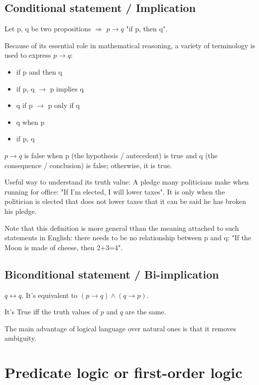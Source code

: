 \documentclass[12pt, a4paper]{book}
\begin{document}
\subsection*{Conditional statement / Implication}

Let p, q be two propositions $\Rightarrow$ $p \rightarrow q $ "if p, then q".

Because of its essential role in mathematical reasoning, a variety of terminology is used to express $p \rightarrow q$:

\begin{itemize}
    \item if p and then q
    \item if p, q $\rightarrow$ p implies q
    \item q if p $\rightarrow$ p only if q
    \item q when p
    \item if p, q
\end{itemize}

$p \rightarrow q$ is false when p (the hypothesis / antecedent) is true and q (the consequence / conclusion) is false; otherwise, it is true.

Useful way to understand its truth value: A pledge many politicians make when running for office: "If I'm elected, I will lower taxes".
It is only when the politician is elected that does not lower taxes that it can be said he has broken his pledge.

\begin{rem}
    Note that this definition is more general tthan the meaning attached to such statements in English: there needs to be no relationship between p and q: "If the Moon is made of cheese, then 2+3=4".
\end{rem}

\subsection*{Biconditional statement / Bi-implication}

$q \leftrightarrow q$. It's equivalent to $(p \rightarrow q) \wedge (q \rightarrow p)$. 

It's True iff the truth values of $p$ and $q$ are the same.

The main advantage of logical language over natural ones is that it removes ambiguity.

\section*{Predicate logic or first-order logic}
\end{document}
